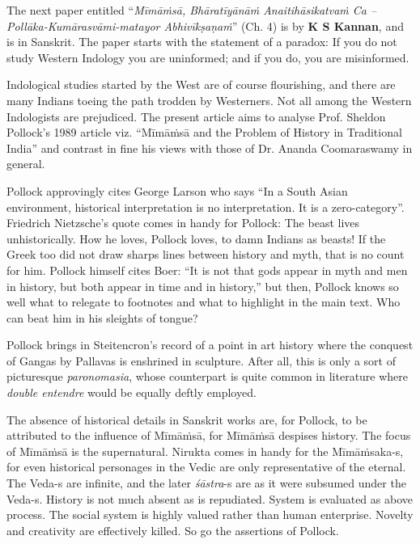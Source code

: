 The next paper entitled “\textit{Mīmāṁsā, Bhāratīyānāṁ Anaitihāsikatvaṁ Ca – Pollāka-Kumārasvāmi-matayor Abhivīkṣaṇaṁ}” (Ch. 4) is by \textbf{K S Kannan}, and is in Sanskrit. The paper starts with the statement of a paradox: If you do not study Western Indology you are uninformed; and if you do, you are misinformed.

Indological studies started by the West are of course flourishing, and there are many Indians toeing the path trodden by Westerners. Not all among the Western Indologists are prejudiced. The present article aims to analyse Prof. Sheldon Pollock’s 1989 article viz. “Mīmāṁsā and the Problem of History in Traditional India” and contrast in fine his views with those of Dr. Ananda Coomaraswamy in general.

 Pollock approvingly cites George Larson who says “In a South Asian environment, historical interpretation is no interpretation. It is a zero-category”. Friedrich Nietzsche’s quote comes in handy for Pollock: The beast lives unhistorically. How he loves, Pollock loves, to damn Indians as beasts! If the Greek too did not draw sharps lines between history and myth, that is no count for him. Pollock himself cites Boer: “It is not that gods appear in myth and men in history, but both appear in time and in history,” but then, Pollock knows so well what to relegate to footnotes and what to highlight in the main text. Who can beat him in his sleights of tongue?

Pollock brings in Steitencron’s record of a point in art history where the conquest of Gangas by Pallavas is enshrined in sculpture. After all, this is only a sort of picturesque \textit{paronomasia}, whose counterpart is quite common in literature where \textit{double entendre} would be equally deftly employed. 

The absence of historical details in Sanskrit works are, for Pollock, to be attributed to the influence of Mīmāṁsā, for Mīmāṁsā despises history. The focus of Mīmāṁsā is the supernatural. Nirukta comes in handy for the Mīmāṁsaka-s,
 for even historical personages in the Vedic are only representative of the eternal. The Veda-s are infinite, and the later \textit{śāstra}-s are as it were subsumed under the Veda-s. History is not much absent as is repudiated. System is evaluated as above process. The social system is highly valued rather than human enterprise. Novelty and creativity are effectively killed. So go the assertions of Pollock.

